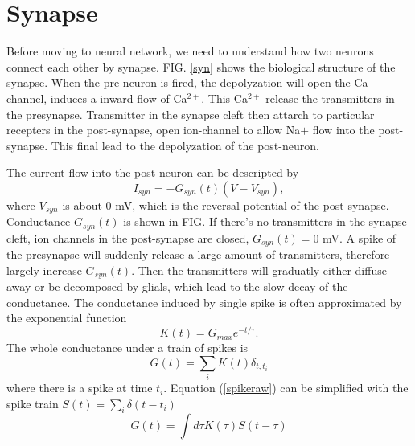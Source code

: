 \documentclass[11pt]{article}
\begin{document}
\section{Synapse}
Before moving to neural network, we need to understand how two neurons connect
each other by synapse. FIG. \ref{syn} shows the biological structure of the
synapse. When the pre-neuron is fired, the depolyzation will open the
Ca-channel, induces a inward flow of Ca$^{2+}$. This Ca$^{2+}$ release the
transmitters in the presynapse. Transmitter in the synapse cleft then attarch to
particular recepters in the post-synapse, open ion-channel to allow Na$+$ flow
into the post-synapse. This final lead to the depolyzation of the post-neuron.

The current flow into the post-neuron can be descripted by
\begin{equation}
  I_{syn} = - G_{syn}(t) (V - V_{syn}),
\end{equation}
where $V_{syn}$ is about $0$ mV, which is the reversal potential of the
post-synapse. Conductance $G_{syn}(t)$ is shown in FIG. If there's no
transmitters in the synapse cleft, ion channels in the post-synapse are closed,
$G_{syn}(t) = 0$ mV.
A spike of the presynapse will suddenly release a large
amount of transmitters, therefore largely increase
$G_{syn}(t)$. Then the transmitters will graduatly either diffuse away or be
decomposed by glials, which lead to the slow decay of the conductance.
The conductance induced by single spike is often approximated by the exponential
function
\begin{equation}
  K(t) = G_{max} e^{-t / \tau}.
\end{equation}
The whole conductance under a train of spikes is
\begin{equation}
  G(t) = \sum_iK(t) \delta_{t,t_i}
  \label{spikeraw}
\end{equation}
where there is a spike at time $t_i$. Equation (\ref{spikeraw}) can be
simplified with the spike train $S(t) = \sum_i\delta(t - t_i)$
\begin{equation}
  G(t) = \int{d\tau}K(\tau)S(t - \tau)
\end{equation}
\end{document}
